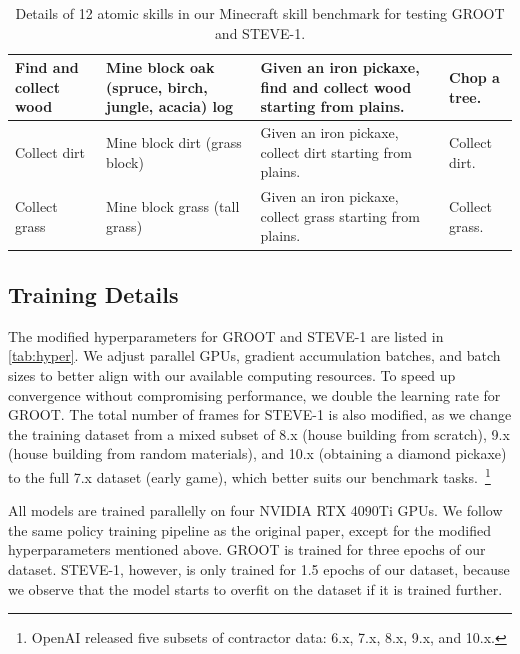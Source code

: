\begin{table}[!ht]
\begin{tabularx}{0.99\linewidth}{@{}>{\centering\arraybackslash}m{1in} >{\centering\arraybackslash}m{2in} >{\centering\arraybackslash}m{2in} >{\centering\arraybackslash}m{1in}@{}}
Find and collect wood & Mine block oak (spruce, birch, jungle, acacia) log & Given an iron pickaxe, \textbf{find} and collect wood starting from \textbf{plains}. & Chop a tree. \\ \hline
Collect dirt & Mine block dirt (grass block) & Given an iron pickaxe, collect dirt starting from plains.  & Collect dirt. \\ \hline
Collect grass & Mine block grass (tall grass) & Given an iron pickaxe, collect grass starting from plains.  & Collect grass. \\
\bottomrule
\end{tabularx}
\caption{Details of 12 atomic skills in our Minecraft skill benchmark for testing GROOT and STEVE-1.}
\label{table: benchmark}
\end{table}

\subsection{Training Details}
\label{app: hyper}
The modified hyperparameters for GROOT and STEVE-1 are listed in \cref{tab:hyper}. We adjust parallel GPUs, gradient accumulation batches, and batch sizes to better align with our available computing resources. To speed up convergence without compromising performance, we double the learning rate for GROOT. The total number of frames for STEVE-1 is also modified, as we change the training dataset from a mixed subset of 8.x (house building from scratch), 9.x (house building from random materials), and 10.x (obtaining a diamond pickaxe) to the full 7.x dataset (early game), which better suits our benchmark tasks.~\footnote{OpenAI released five subsets of contractor data: 6.x, 7.x, 8.x, 9.x, and 10.x.}

All models are trained parallelly on four NVIDIA RTX 4090Ti GPUs. We follow the same policy training pipeline as the original paper, except for the modified hyperparameters mentioned above. GROOT is trained for three epochs of our dataset. STEVE-1, however, is only trained for 1.5 epochs of our dataset, because we observe that the model starts to overfit on the dataset if it is trained further.   

